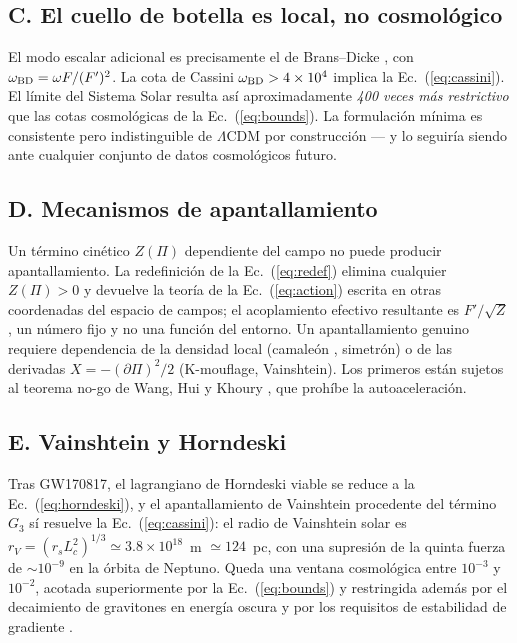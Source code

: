 \documentclass[aps,prd,twocolumn,superscriptaddress,nofootinbib,floatfix]{revtex4-2}
\newcommand{\LCDM}{\ensuremath{\Lambda}CDM}
\begin{document}
\subsection*{C. El cuello de botella es local, no cosmol\'ogico}

El modo escalar adicional es precisamente el de Brans--Dicke
\cite{BransDicke1961}, con $\omega_{\rm BD}=\omega F/(F')^2$. La cota
de Cassini $\omega_{\rm BD}>4\times10^4$ \cite{Bertotti2003} implica la
Ec.~(\ref{eq:cassini}). El l\'imite del Sistema Solar resulta as\'i
aproximadamente \emph{400 veces m\'as restrictivo} que las cotas
cosmol\'ogicas de la Ec.~(\ref{eq:bounds}). La formulaci\'on m\'inima es
consistente pero indistinguible de \LCDM{} por construcci\'on --- y lo
seguir\'ia siendo ante cualquier conjunto de datos cosmol\'ogicos
futuro.

\subsection*{D. Mecanismos de apantallamiento}

Un t\'ermino cin\'etico $Z(\Pi)$ dependiente del campo no puede
producir apantallamiento. La redefinici\'on de la
Ec.~(\ref{eq:redef}) elimina cualquier $Z(\Pi)>0$ y devuelve la teor\'ia
de la Ec.~(\ref{eq:action}) escrita en otras coordenadas del espacio de
campos; el acoplamiento efectivo resultante es $F'/\sqrt{Z}$, un
n\'umero fijo y no una funci\'on del entorno. Un apantallamiento
genuino requiere dependencia de la densidad local (camale\'on
\cite{Khoury2004}, simetr\'on) o de las derivadas
$X=-(\partial\Pi)^2/2$ (K-mouflage, Vainshtein). Los primeros est\'an
sujetos al teorema no-go de Wang, Hui y Khoury \cite{Wang2012}, que
proh\'ibe la autoaceleraci\'on.

\subsection*{E. Vainshtein y Horndeski}

Tras GW170817, el lagrangiano de Horndeski viable se reduce a la
Ec.~(\ref{eq:horndeski}), y el apantallamiento de Vainshtein
\cite{Vainshtein1972} procedente del t\'ermino $G_3$ s\'i resuelve la
Ec.~(\ref{eq:cassini}): el radio de Vainshtein solar es
$r_V=(r_s L_c^2)^{1/3}\simeq3.8\times10^{18}$~m $\simeq124$~pc, con una
supresi\'on de la quinta fuerza de $\sim10^{-9}$ en la \'orbita de
Neptuno. Queda una ventana cosmol\'ogica entre $10^{-3}$ y $10^{-2}$,
acotada superiormente por la Ec.~(\ref{eq:bounds}) y restringida
adem\'as por el decaimiento de gravitones en energ\'ia oscura
\cite{Creminelli2018} y por los requisitos de estabilidad de gradiente
\cite{Kobayashi2019}.
\end{document}
